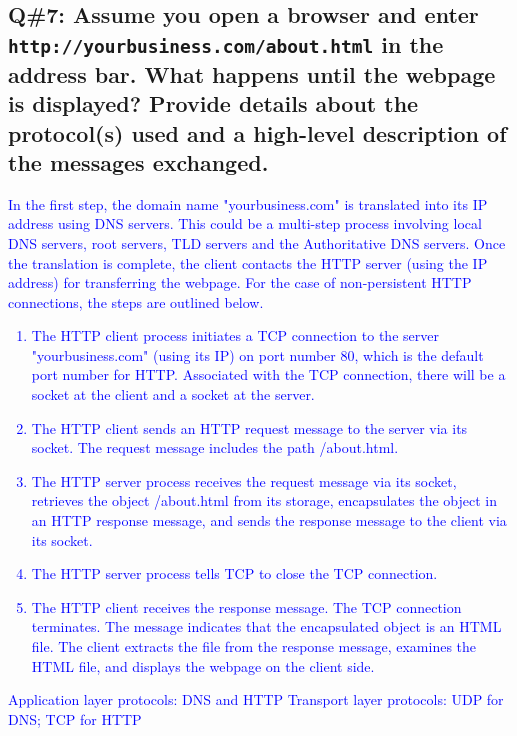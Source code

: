 \subsection*{Q\#7: Assume you open a browser and enter \texttt{http://yourbusiness.com/about.html} in the address bar. What happens until the webpage is displayed? Provide details about the protocol(s) used and a high-level description of the messages exchanged.}
\textcolor{blue}{
In the first step, the domain name "yourbusiness.com" is translated into its IP address using DNS servers. This could be a multi-step process involving local DNS servers, root servers, TLD servers and the Authoritative DNS servers.
Once the translation is complete, the client contacts the HTTP server (using the IP address) for transferring the webpage. For the case of non-persistent HTTP connections, the steps are outlined below.
\begin{enumerate}
    \item The HTTP client process initiates a TCP connection to the server "yourbusiness.com" (using its IP) on port number 80, which is the default port number for HTTP. Associated with the TCP connection, there will be a socket at the client and a socket at the server.
    \item The HTTP client sends an HTTP request message to the server via its socket. The request message includes the path /about.html.
    \item The HTTP server process receives the request message via its socket, retrieves the object /about.html from its storage, encapsulates the object in an HTTP response message, and sends the response message to the client via its socket.
    \item The HTTP server process tells TCP to close the TCP connection.
    \item The HTTP client receives the response message. The TCP connection terminates. The message indicates that the encapsulated object is an HTML file. The client extracts the file from the response message, examines the HTML file, and displays the webpage on the client side.
\end{enumerate}
Application layer protocols: DNS and HTTP
\newline
Transport layer protocols: UDP for DNS; TCP for HTTP
}
